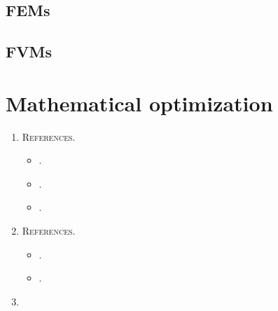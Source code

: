 \documentclass{book}
\numberwithin{equation}{section}
\begin{document}
\subsection{FEMs}

\subsection{FVMs}

\section{Mathematical optimization}
\begin{enumerate}
    \item {}
    
    \textsc{References.}
    \begin{itemize}
        \item \cite{Troltzsch2010}.
        \item \cite{Kroener2011}.
        \item \cite{Kroener2019}.
    \end{itemize}
    \item {}
    
    \textsc{References.}
    \begin{itemize}
        \item \cite{Othmer_Kaminski_Giering2006}.
        \item \cite{Sigmund_Maute2013}.
    \end{itemize}
    \item {}
    

\end{enumerate}
\end{document}

